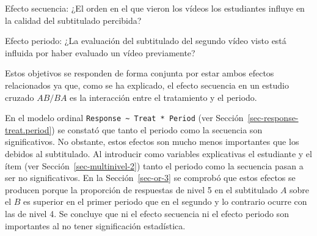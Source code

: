\documentclass[
  12pt,
  a4paper,
  extrafontsizes,
  onecolumn,
  openright,
  table]{memoir}
\begin{document}
\begin{tcolorbox}[enhanced jigsaw, arc=.35mm, bottomtitle=1mm, left=2mm, toptitle=1mm, breakable, opacitybacktitle=0.6, rightrule=.15mm, toprule=.15mm, colbacktitle=quarto-callout-tip-color!10!white, leftrule=.75mm, colframe=quarto-callout-tip-color-frame, colback=white, titlerule=0mm, opacityback=0, bottomrule=.15mm, coltitle=black, title=\textcolor{quarto-callout-tip-color}{\faLightbulb}\hspace{0.5em}{Objetivo específico}]

Efecto secuencia: ¿El orden en el que vieron los vídeos los estudiantes
influye en la calidad del subtitulado percibida?

\end{tcolorbox}

\begin{tcolorbox}[enhanced jigsaw, arc=.35mm, bottomtitle=1mm, left=2mm, toptitle=1mm, breakable, opacitybacktitle=0.6, rightrule=.15mm, toprule=.15mm, colbacktitle=quarto-callout-tip-color!10!white, leftrule=.75mm, colframe=quarto-callout-tip-color-frame, colback=white, titlerule=0mm, opacityback=0, bottomrule=.15mm, coltitle=black, title=\textcolor{quarto-callout-tip-color}{\faLightbulb}\hspace{0.5em}{Objetivo específico}]

Efecto periodo: ¿La evaluación del subtitulado del segundo vídeo visto
está influida por haber evaluado un vídeo previamente?

\end{tcolorbox}

Estos objetivos se responden de forma conjunta por estar ambos efectos
relacionados ya que, como se ha explicado, el efecto secuencia en un
estudio cruzado \(AB/BA\) es la interacción entre el tratamiento y el
periodo.

En el modelo ordinal
\texttt{Response\ \textasciitilde{}\ Treat\ *\ Period} (ver
Sección~\ref{sec-response-treat.period}) se constató que tanto el
periodo como la secuencia son significativos. No obstante, estos efectos
son mucho menos importantes que los debidos al subtitulado. Al
introducir como variables explicativas el estudiante y el ítem (ver
Sección~\ref{sec-multinivel-2}) tanto el periodo como la secuencia pasan
a ser no significativos. En la Sección~\ref{sec-or-3} se comprobó que
estos efectos se producen porque la proporción de respuestas de nivel 5
en el subtitulado \(A\) sobre el \(B\) es superior en el primer periodo
que en el segundo y lo contrario ocurre con las de nivel 4. Se concluye
que ni el efecto secuencia ni el efecto periodo son importantes al no
tener significación estadística.
\end{document}
